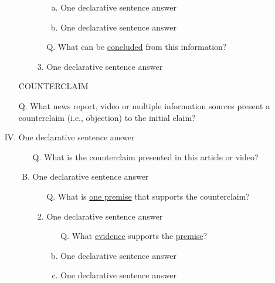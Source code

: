 \documentclass[a4paper, 12pt]{article}
\begin{document}
\begin{enumerate}[I.]
\begin{enumerate}[A.]
\begin{enumerate}[1.]
\begin{enumerate}[a.]
                                  \item {\color{gray} One declarative sentence answer} %
                                  \item {\color{gray} One declarative sentence answer} %
                              \end{enumerate}
                        \item [Q.] What can be \underline{concluded} from this information?
                        \item {\color{gray} One declarative sentence answer} %
                    \end{enumerate}
          \end{enumerate}
    \item [] {\color{red}COUNTERCLAIM}
    \item [Q.] What news report, video or multiple information sources present a {\color{red} counterclaim} (i.e., objection) to
          the {\color{blue} initial claim}?
    \item {\color{gray} One declarative sentence answer} %
          \begin{enumerate}[A.]
              \item [Q.] What is the {\color{red} counterclaim} presented in this article or video?
              \item {\color{gray} One declarative sentence answer} %
                    \begin{enumerate}[1.]
                        \item[Q.] What is \underline{one premise} that supports the {\color{red}counterclaim}?
                        \item{\color{gray} One declarative sentence answer} %
                              \begin{enumerate}[a.]
                                  \item [Q.] What \underline{evidence} supports the \underline{premise}?
                                  \item {\color{gray} One declarative sentence answer} %
                                  \item {\color{gray} One declarative sentence answer} %

\end{enumerate}
\end{enumerate}
\end{enumerate}
\end{enumerate}
\end{document}
